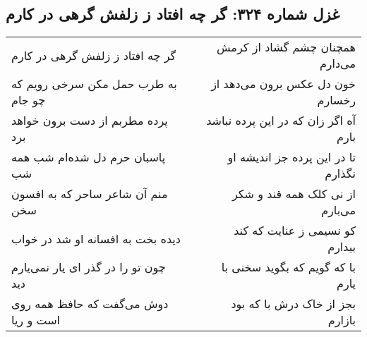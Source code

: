 \begin{center}
\section*{غزل شماره ۳۲۴: گر چه افتاد ز زلفش گرهی در کارم}
\label{sec:sh324}
\begin{longtable}{l p{0.5cm} r}
گر چه افتاد ز زلفش گرهی در کارم
&&
همچنان چشم گشاد از کرمش می‌دارم
\\
به طرب حمل مکن سرخی رویم که چو جام
&&
خون دل عکس برون می‌دهد از رخسارم
\\
پرده مطربم از دست برون خواهد برد
&&
آه اگر زان که در این پرده نباشد بارم
\\
پاسبان حرم دل شده‌ام شب همه شب
&&
تا در این پرده جز اندیشه او نگذارم
\\
منم آن شاعر ساحر که به افسون سخن
&&
از نی کلک همه قند و شکر می‌بارم
\\
دیده بخت به افسانه او شد در خواب
&&
کو نسیمی ز عنایت که کند بیدارم
\\
چون تو را در گذر ای یار نمی‌یارم دید
&&
با که گویم که بگوید سخنی با یارم
\\
دوش می‌گفت که حافظ همه روی است و ریا
&&
بجز از خاک درش با که بود بازارم
\\
\end{longtable}
\end{center}
